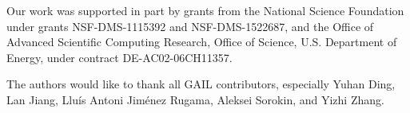 \documentclass[sigconf]{acmart}
\begin{document}
\maketitle

 



 


\begin{acks}
Our work was supported in part by grants from the National
Science Foundation under grants NSF-DMS-1115392 and NSF-DMS-1522687, and the Office
of Advanced Scientific Computing Research, Office of Science,
U.S. Department of Energy, under contract DE-AC02-06CH11357.
  
The authors would like to thank all GAIL contributors,
especially Yuhan Ding, Lan Jiang, Llu\'is Antoni Jim\'enez
Rugama, Aleksei Sorokin, and Yizhi Zhang.
\end{acks}




 
\end{document}
